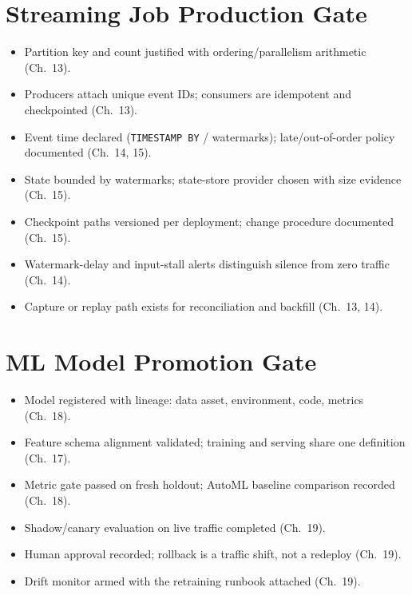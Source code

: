 \section{Streaming Job Production Gate}
\begin{itemize}
    \item[$\square$] Partition key and count justified with ordering/parallelism arithmetic (Ch.~13).
    \item[$\square$] Producers attach unique event IDs; consumers are idempotent and checkpointed (Ch.~13).
    \item[$\square$] Event time declared (\texttt{TIMESTAMP BY} / watermarks); late/out-of-order policy documented (Ch.~14, 15).
    \item[$\square$] State bounded by watermarks; state-store provider chosen with size evidence (Ch.~15).
    \item[$\square$] Checkpoint paths versioned per deployment; change procedure documented (Ch.~15).
    \item[$\square$] Watermark-delay and input-stall alerts distinguish silence from zero traffic (Ch.~14).
    \item[$\square$] Capture or replay path exists for reconciliation and backfill (Ch.~13, 14).
\end{itemize}

\section{ML Model Promotion Gate}
\begin{itemize}
    \item[$\square$] Model registered with lineage: data asset, environment, code, metrics (Ch.~18).
    \item[$\square$] Feature schema alignment validated; training and serving share one definition (Ch.~17).
    \item[$\square$] Metric gate passed on fresh holdout; AutoML baseline comparison recorded (Ch.~18).
    \item[$\square$] Shadow/canary evaluation on live traffic completed (Ch.~19).
    \item[$\square$] Human approval recorded; rollback is a traffic shift, not a redeploy (Ch.~19).
    \item[$\square$] Drift monitor armed with the retraining runbook attached (Ch.~19).
\end{itemize}

